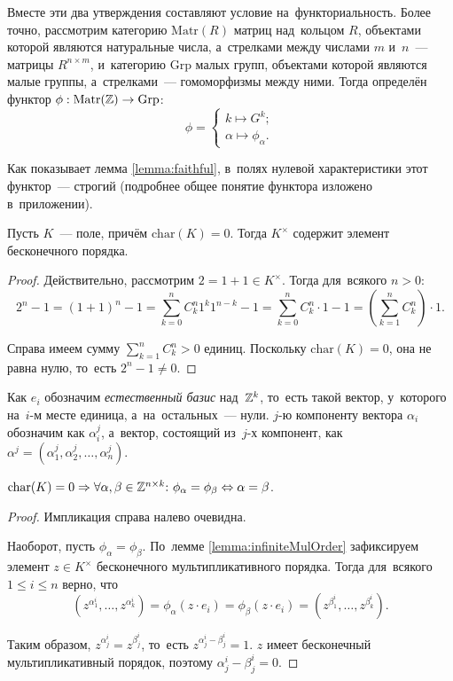\documentclass[a4paper,oneside]{article}
\newcommand{\notewrap}[1]{(#1)}
\begin{document}
Вместе эти два утверждения составляют условие на~функториальность. Более точно, рассмотрим категорию
$\mathrm{Matr}(R)$ матриц над~кольцом $R$, объектами которой являются натуральные числа, а~стрелками
между числами $m$ и~$n$~— матрицы $R^{n \times m}$, и~категорию $\mathrm{Grp}$ малых групп,
объектами которой являются малые группы, а~стрелками~— гомоморфизмы между ними.
Тогда определён функтор $\phi : \mathrm{Matr}(\mathbb{Z}) \rightarrow \mathrm{Grp}$:
\[
  \phi = \begin{cases}
    k \mapsto G^k; \\
    \alpha \mapsto \phi_\alpha.
  \end{cases}
\]

Как показывает лемма \ref{lemma:faithful}, в~полях нулевой характеристики этот функтор~— строгий
(подробнее общее понятие функтора изложено в~приложении).

\begin{lemma}
\label{lemma:infiniteMulOrder}
  Пусть $K$~— поле, причём $\mathrm{char}(K) = 0$.
  Тогда $K^\times$ содержит элемент бесконечного порядка.
\end{lemma}

\begin{proof}
  Действительно, рассмотрим $2 = 1 + 1 \in K^\times$. Тогда для~всякого $n > 0$:
  \[
      2^n - 1 = (1 + 1)^n - 1 = \sum_{k = 0}^n C^n_k 1^k 1^{n - k} - 1
                              = \sum_{k = 0}^n C^n_k \cdot 1 - 1
                              = \left(\sum_{k = 1}^n C^n_k \right) \cdot 1.
  \]

  Справа имеем сумму $\sum_{k = 1}^n C^n_k > 0$ единиц. Поскольку $\mathrm{char}(K) = 0$,
  она не равна нулю, то~есть $2^n - 1 \neq 0$.
\end{proof}

Как $e_i$ обозначим \textit{естественный базис} над~$\mathbb{Z}^k$, то~есть такой вектор, у~которого на~$i$-м месте единица, а~на~остальных~— нули.
$j$-ю компоненту вектора $\alpha_i$ обозначим как $\alpha_i^j$, а~вектор, состоящий из~$j$-х компонент,
как $\alpha^j = (\alpha_1^j, \alpha_2^j, \ldots, \alpha_n^j)$.

\begin{lemma}[\notewrap{строгость}]
\label{lemma:faithful}
  $
    \mathrm{char}(K) = 0 \Rightarrow \forall \alpha, \beta \in \mathbb{Z}^{n \times k}{:} \ \phi_\alpha = \phi_\beta \Leftrightarrow \alpha = \beta
  $.
\end{lemma}

\begin{proof}
  Импликация справа налево очевидна.

  Наоборот, пусть $\phi_\alpha = \phi_\beta$. По~лемме \ref{lemma:infiniteMulOrder} зафиксируем
  элемент $z \in K^\times$ бесконечного мультипликативного порядка.
  Тогда для~всякого $1 \leq i \leq n$ верно, что
  \[
    (z^{\alpha_1^i}, \ldots, z^{\alpha_k^i}) = \phi_\alpha(z \cdot e_i) = \phi_\beta(z \cdot e_i) = (z^{\beta_1^i}, \ldots, z^{\beta_k^i}).
  \]

  Таким образом, $z^{\alpha_j^i} = z^{\beta_j^i}$, то~есть $z^{\alpha_j^i - \beta_j^i} = 1$.
  $z$ имеет бесконечный мультипликативный порядок, поэтому $\alpha_j^i - \beta_j^i = 0$.
\end{proof}
\end{document}
